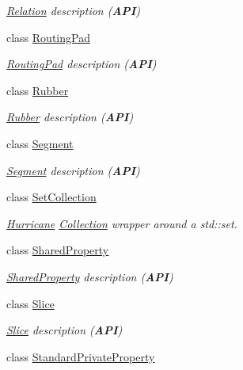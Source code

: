 \begin{DoxyCompactItemize}
\begin{DoxyCompactList}\small\item\em \hyperlink{classHurricane_1_1Relation}{Relation} description ({\bfseries A\+PI}) \end{DoxyCompactList}\item 
class \hyperlink{classHurricane_1_1RoutingPad}{Routing\+Pad}
\begin{DoxyCompactList}\small\item\em \hyperlink{classHurricane_1_1RoutingPad}{Routing\+Pad} description ({\bfseries A\+PI}) \end{DoxyCompactList}\item 
class \hyperlink{classHurricane_1_1Rubber}{Rubber}
\begin{DoxyCompactList}\small\item\em \hyperlink{classHurricane_1_1Rubber}{Rubber} description ({\bfseries A\+PI}) \end{DoxyCompactList}\item 
class \hyperlink{classHurricane_1_1Segment}{Segment}
\begin{DoxyCompactList}\small\item\em \hyperlink{classHurricane_1_1Segment}{Segment} description ({\bfseries A\+PI}) \end{DoxyCompactList}\item 
class \hyperlink{classHurricane_1_1SetCollection}{Set\+Collection}
\begin{DoxyCompactList}\small\item\em \hyperlink{namespaceHurricane}{Hurricane} \hyperlink{classHurricane_1_1Collection}{Collection} wrapper around a std\+::set. \end{DoxyCompactList}\item 
class \hyperlink{classHurricane_1_1SharedProperty}{Shared\+Property}
\begin{DoxyCompactList}\small\item\em \hyperlink{classHurricane_1_1SharedProperty}{Shared\+Property} description ({\bfseries A\+PI}) \end{DoxyCompactList}\item 
class \hyperlink{classHurricane_1_1Slice}{Slice}
\begin{DoxyCompactList}\small\item\em \hyperlink{classHurricane_1_1Slice}{Slice} description ({\bfseries A\+PI}) \end{DoxyCompactList}\item 
class \hyperlink{classHurricane_1_1StandardPrivateProperty}{Standard\+Private\+Property}

\end{DoxyCompactItemize}
